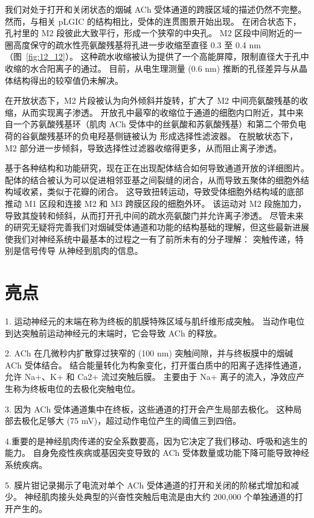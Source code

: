 我们对处于打开和关闭状态的烟碱 ACh 受体通道的跨膜区域的描述仍然不完整。
然而，与相关 pLGIC 的结构相比，受体的连贯图景开始出现。
在闭合状态下，孔衬里的 M2 段彼此大致平行，形成一个狭窄的中央孔。
M2 区段中间附近的一圈高度保守的疏水性亮氨酸残基将孔进一步收缩至直径 0.3 至 0.4 nm（图~\ref{fig:12_12}）。
这种疏水收缩被认为提供了一个高能屏障，限制直径大于孔中收缩的水合阳离子的通过。
目前，从电生理测量 (0.6 nm) 推断的孔径差异与从晶体结构得出的较窄值仍未解决。


在开放状态下，M2 片段被认为向外倾斜并旋转，扩大了 M2 中间亮氨酸残基的收缩，从而实现离子渗透。
开放孔中最窄的收缩位于通道的细胞内口附近，其中来自一个苏氨酸残基环（肌肉 ACh 受体中的丝氨酸和苏氨酸残基）和第二个带负电荷的谷氨酸残基环的负电羟基侧链被认为 形成选择性滤波器。
在脱敏状态下，M2 部分进一步倾斜，导致选择性过滤器收缩得更多，从而阻止离子渗透。


基于各种结构和功能研究，现在正在出现配体结合如何导致通道开放的详细图片。
配体的结合被认为可以促进相邻亚基之间裂缝的闭合，从而导致五聚体的细胞外结构域收紧，类似于花瓣的闭合。 
这导致扭转运动，导致受体细胞外结构域的底部推动 M1 区段和连接 M2 和 M3 跨膜区段的细胞外环。
该运动对 M2 段施加力，导致其旋转和倾斜，从而打开孔中间的疏水亮氨酸门并允许离子渗透。
尽管未来的研究无疑将完善我们对烟碱受体通道和功能的结构基础的理解，但这些最新进展使我们对神经系统中最基本的过程之一有了前所未有的分子理解：
突触传递，特别是信号传导 从神经到肌肉的信息。



\section{亮点}

1. 运动神经元的末端在称为终板的肌膜特殊区域与肌纤维形成突触。
当动作电位到达突触前运动神经元的末端时，它会导致 ACh 的释放。 


2. ACh 在几微秒内扩散穿过狭窄的 (100 nm) 突触间隙，并与终板膜中的烟碱 ACh 受体结合。
结合能量转化为构象变化，打开蛋白质中的阳离子选择性通道，允许 Na+、K+ 和 Ca2+ 流过突触后膜。
主要由于 Na+ 离子的流入，净效应产生称为终板电位的去极化突触电位。 


3. 因为 ACh 受体通道集中在终板，这些通道的打开会产生局部去极化。
这种局部去极化足够大 (75 mV)，超过动作电位产生的阈值三到四倍。 


4.重要的是神经肌肉传递的安全系数要高，因为它决定了我们移动、呼吸和逃生的能力。
自身免疫性疾病或基因突变导致的 ACh 受体数量或功能下降可能导致神经系统疾病。 


5. 膜片钳记录揭示了电流对单个 ACh 受体通道的打开和关闭的阶梯式增加和减少。
神经肌肉接头处典型的兴奋性突触后电流是由大约 200,000 个单独通道的打开产生的。 


